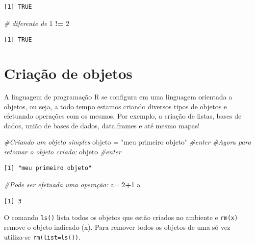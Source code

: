 \documentclass[12pt,brazil,oneside]{book}
\newenvironment{Shaded}{\begin{snugshade}}{\end{snugshade}}
\newcommand{\CommentTok}[1]{\textcolor[rgb]{0.56,0.35,0.01}{\textit{#1}}}
\newcommand{\DecValTok}[1]{\textcolor[rgb]{0.00,0.00,0.81}{#1}}
\newcommand{\NormalTok}[1]{#1}
\newcommand{\OperatorTok}[1]{\textcolor[rgb]{0.81,0.36,0.00}{\textbf{#1}}}
\newcommand{\StringTok}[1]{\textcolor[rgb]{0.31,0.60,0.02}{#1}}
\begin{document}
\begin{verbatim}
[1] TRUE
\end{verbatim}

\begin{Shaded}
\begin{Highlighting}[]
\CommentTok{# diferente de}
\DecValTok{1} \OperatorTok{!=}\StringTok{ }\DecValTok{2}
\end{Highlighting}
\end{Shaded}

\begin{verbatim}
[1] TRUE
\end{verbatim}

\hypertarget{criacao-de-objetos}{%
\section{Criação de objetos}\label{criacao-de-objetos}}

A linguagem de programação R se configura em uma linguagem orientada a objetos, ou seja, a todo tempo estamos criando diversos tipos de objetos e efetuando operações com os mesmos. Por exemplo, a criação de listas, bases de dados, união de bases de dados, data.frames e até mesmo mapas!

\begin{Shaded}
\begin{Highlighting}[]
\CommentTok{#Criando um objeto simples}
\NormalTok{objeto =}\StringTok{ "meu primeiro objeto"} \CommentTok{#enter}
\CommentTok{#Agora para retomar o objeto criado:}
\NormalTok{objeto }\CommentTok{#enter}
\end{Highlighting}
\end{Shaded}

\begin{verbatim}
[1] "meu primeiro objeto"
\end{verbatim}

\begin{Shaded}
\begin{Highlighting}[]
\CommentTok{#Pode ser efetuada uma operação:}
\NormalTok{a=}\StringTok{ }\DecValTok{2}\OperatorTok{+}\DecValTok{1}
\NormalTok{a}
\end{Highlighting}
\end{Shaded}

\begin{verbatim}
[1] 3
\end{verbatim}

O comando \texttt{ls()} lista todos os objetos que estão criados no ambiente e \texttt{rm(x)} remove o objeto indicado (x). Para remover todos os objetos de uma só vez utiliza-se \texttt{rm(list=ls())}.
\end{document}
